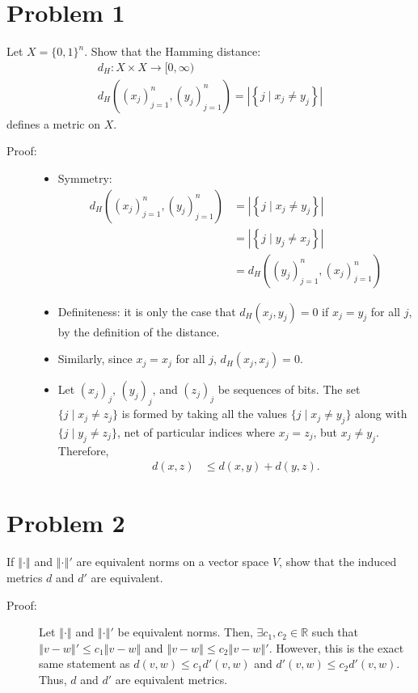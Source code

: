 \documentclass[8pt]{extarticle}
\title{}
\author{}
\date{}
\newcommand{\R}{\mathbb{R}}
\newcommand{\norm}[1]{\left\Vert #1\right\Vert}
\begin{document}
  \section{Problem 1}%
  Let $X = \{0,1\}^n$. Show that the Hamming distance:
  \begin{align*}
    d_H: X\times X \rightarrow [0,\infty)\\
    d_H\left((x_j)_{j=1}^{n},(y_j)_{j=1}^{n}\right) = \left|\left\{j\mid x_j\neq y_j\right\}\right|
  \end{align*}
  defines a metric on $X$.
  \begin{description}
    \item[Proof:]\hfill
      \begin{itemize}
        \item Symmetry:
          \begin{align*}
            d_H\left((x_j)_{j=1}^{n},(y_j)_{j=1}^{n}\right) &= \left|\left\{j\mid x_j \neq y_j\right\}\right|\\
                                                            &= \left|\left\{j\mid y_j \neq x_j\right\}\right|\\
                                                            &= d_H\left((y_j)_{j=1}^{n},(x_j)_{j=1}^{n}\right)
          \end{align*}
        \item Definiteness: it is only the case that $d_H(x_j,y_j) = 0$ if $x_j = y_j$ for all $j$, by the definition of the distance.
        \item Similarly, since $x_j = x_j$ for all $j$, $d_H(x_j,x_j) = 0$.
        \item Let $(x_j)_j$, $(y_j)_j$, and $(z_j)_j$ be sequences of bits. The set $\{j\mid x_j\neq z_j\}$ is formed by taking all the values $\{j\mid x_j\neq y_j\}$ along with $\{j\mid y_j\neq z_j\}$, net of particular indices where $x_j = z_j$, but $x_j\neq y_j$. Therefore,
          \begin{align*}
            d(x,z) &\leq d(x,y) + d(y,z).
          \end{align*}
      \end{itemize}
  \end{description}
  \section{Problem 2}%
  If $\norm{\cdot}$ and $\norm{\cdot}'$ are equivalent norms on a vector space $V$, show that the induced metrics $d$ and $d'$ are equivalent.
  \begin{description}
    \item[Proof:] Let $\norm{\cdot}$ and $\norm{\cdot}'$ be equivalent norms. Then, $\exists c_1,c_2\in \R$ such that $\norm{v-w}' \leq c_1\norm{v-w}$ and $\norm{v-w} \leq c_2\norm{v-w}'$. However, this is the exact same statement as $d(v,w)\leq c_1d'(v,w)$ and $d'(v,w)\leq c_2d'(v,w)$. Thus, $d$ and $d'$ are equivalent metrics.
  \end{description}
\end{document}
